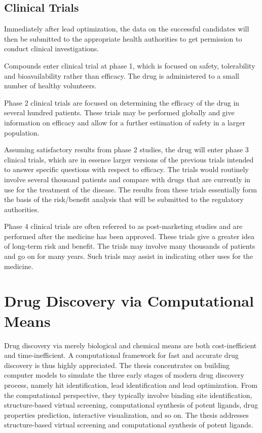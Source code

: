 \subsection{Clinical Trials}

Immediately after lead optimization, the data on the successful candidates will then be submitted to the appropriate health authorities to get permission to conduct clinical investigations.

Compounds enter clinical trial at phase 1, which is focused on safety, tolerability and bioavailability rather than efficacy. The drug is administered to a small number of healthy volunteers.

Phase 2 clinical trials are focused on determining the efficacy of the drug in several hundred patients. These trials may be performed globally and give information on efficacy and allow for a further estimation of safety in a larger population.

Assuming satisfactory results from phase 2 studies, the drug will enter phase 3 clinical trials, which are in essence larger versions of the previous trials intended to answer specific questions with respect to efficacy. The trials would routinely involve several thousand patients and compare with drugs that are currently in use for the treatment of the disease. The results from these trials essentially form the basis of the risk/benefit analysis that will be submitted to the regulatory authorities.

Phase 4 clinical trials are often referred to as post-marketing studies and are performed after the medicine has been approved. These trials give a greater idea of long-term risk and benefit. The trials may involve many thousands of patients and go on for many years. Such trials may assist in indicating other uses for the medicine.

\section{Drug Discovery via Computational Means}

Drug discovery via merely biological and chemical means are both cost-inefficient and time-inefficient. A computational framework for fast and accurate drug discovery is thus highly appreciated. The thesis concentrates on building computer models to simulate the three early stages of modern drug discovery process, namely hit identification, lead identification and lead optimization. From the computational perspective, they typically involve binding site identification, structure-based virtual screening, computational synthesis of potent ligands, drug properties prediction, interactive visualization, and so on. The thesis addresses structure-based virtual screening and computational synthesis of potent ligands.

